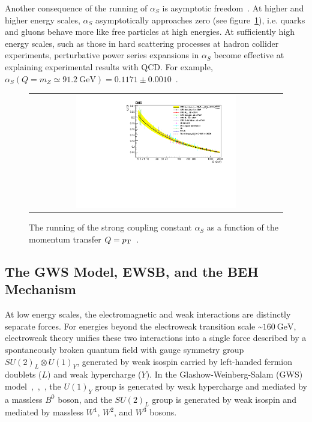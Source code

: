 \begin{refsection}
Another consequence of the running of $\alpha_S$ is asymptotic freedom~\cite{PhysRevLett.30.1343}.
At higher and higher energy scales, $\alpha_S$ asymptotically approaches zero (see figure~\ref{alphaS_running}), i.e. quarks and gluons behave more like free particles at high energies.
At sufficiently high energy scales, such as those in hard scattering processes at hadron collider experiments, perturbative power series expansions in $\alpha_S$ become effective at explaining experimental results with QCD.
For example, $\alpha_S(Q = m_Z \simeq  \SI{91.2}{\GeV}) = 0.1171 \pm 0.0010$~\cite{PhysRevD.103.034028}.
\begin{figure}[htb]
  \begin{center}
    \begin{tabular}{c}
        \includegraphics[width=0.65\textwidth]{fig_Theory/alphaS_running.pdf}
    \end{tabular}
    \caption{The running of the strong coupling constant $\alpha_S$ as a function of the momentum transfer $Q = p_{\mathrm{T}}$~\cite{alphaS_running}.
            }
    \label{alphaS_running}
  \end{center}
\end{figure}

\subsection{The GWS Model, EWSB, and the BEH Mechanism}
At low energy scales, the electromagnetic and weak interactions are distinctly separate forces.
For energies beyond the electroweak transition scale \sim$\SI{160}{\GeV}$, electroweak theory unifies these two interactions into a single force described by a spontaneously broken quantum field with gauge symmetry group $SU(2)_L \otimes U(1)_Y$, generated by weak isospin carried by left-handed fermion doublets ($L$) and weak hypercharge ($Y$).
In the Glashow-Weinberg-Salam (GWS) model~\cite{GLASHOW1961579},~\cite{PhysRevLett.19.1264},~\cite{doi:10.1142/9789812795915_0034}, the $U(1)_Y$ group is generated by weak hypercharge and mediated by a massless $B^0$ boson, and the $SU(2)_L$ group is generated by weak isospin and mediated by massless $W^1$, $W^2$, and $W^3$ bosons.


\end{refsection}
